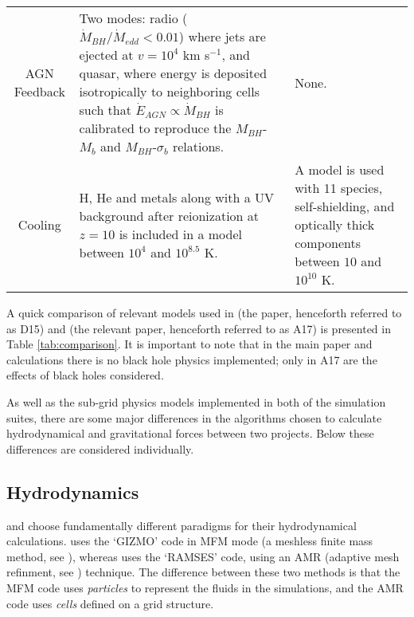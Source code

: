 \begin{table*}
\begin{tabularx}{\textwidth}{cXX}
    AGN Feedback & Two modes: radio ($\dot{M}_{BH}/\dot{M}_{edd} < 0.01$) where jets are ejected at $v = 10^{4}$ km s$^{-1}$, and quasar, where energy is deposited isotropically to neighboring cells such that $\dot{E}_{AGN} \propto \dot{M}_{BH}$ is calibrated to reproduce the $M_{BH}$-$M_b$ and $M_{BH}$-$\sigma_b$ relations. & None. \\
    Cooling & H, He and metals along with a UV background after reionization at $z=10$ is included in a \citet{sutherland_cooling_1993} model between $10^4$ and $10^{8.5}$ K. & A \citet{hopkins_galaxies_2014} model is used with 11 species, self-shielding, and optically thick components between $10$ and $10^{10}$ K. 
  \end{tabularx}
  \caption{A comparison of the various models used within both the \hagn{} and
    \fire{} simulation projects. Note that the black hole phyiscs considered in
    this table is \emph{only} presented in \citet{angles-alcazar_black_2017},
    and not in the main \fire{} paper \citep{hopkins_fire-2_2017} as the
    original set of \fire{} runs contains \emph{no black hole physics
    whatsoever}. Missing variable definitions can be found in the text.}
  \label{tab:comparison}
\end{table*}
\restoregeometry

A quick comparison of relevant models used in \citet{dubois_black_2015}
(the \hagn{} paper, henceforth referred to as D15) and
\citet{angles-alcazar_black_2017} (the relevant \fire{} paper, henceforth
referred to as A17) is presented in Table \ref{tab:comparison}. It is important
to note that in the main \fire{} paper \citep{hopkins_fire-2_2017} and 
calculations there is no black hole physics implemented; only in A17 are
the effects of black holes considered.

As well as the sub-grid physics models implemented in both of the simulation
suites, there are some major differences in the algorithms chosen to calculate
hydrodynamical and gravitational forces between two projects. Below these
differences are considered individually.

\subsection{Hydrodynamics}

\hagn{} and \fire{} choose fundamentally different paradigms for their
hydrodynamical calculations. \fire{} uses the `GIZMO' code in MFM mode
(a meshless finite mass method, see \citet{hopkins_gizmo:_2015}), whereas
\hagn{} uses the `RAMSES' code, using an AMR (adaptive mesh refinment, see
\citet{teyssier_cosmological_2002}) technique. The difference between
these two methods is that the MFM code uses \emph{particles} to represent
the fluids in the simulations, and the AMR code uses \emph{cells} defined
on a grid structure.

